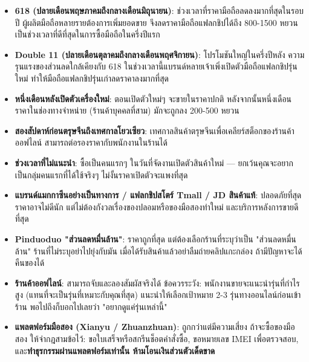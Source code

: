 \begin{itemize}
  \item \textbf{618 (ปลายเดือนพฤษภาคมถึงกลางเดือนมิถุนายน)}: ช่วงเวลาที่ราคามือถือลดลงมากที่สุดในรอบปี ผู้ผลิตมือถือหลายรายต้องการเพิ่มยอดขาย จึงลดราคามือถือแฟลกชิปได้ถึง 800-1500 หยวน เป็นช่วงเวลาที่ดีที่สุดในการซื้อมือถือในครึ่งปีแรก
  \item \textbf{Double 11 (ปลายเดือนตุลาคมถึงกลางเดือนพฤศจิกายน)}: โปรโมชันใหญ่ในครึ่งปีหลัง ความรุนแรงของส่วนลดใกล้เคียงกับ 618 ในช่วงเวลานี้แบรนด์หลายเจ้าเพิ่งเปิดตัวมือถือแฟลกชิปรุ่นใหม่ ทำให้มือถือแฟลกชิปรุ่นเก่าลดราคาลงมากที่สุด
  \item \textbf{หนึ่งเดือนหลังเปิดตัวเครื่องใหม่}: ตอนเปิดตัวใหม่ๆ จะขายในราคาปกติ หลังจากนั้นหนึ่งเดือน ราคาในช่องทางจำหน่าย (ร้านค้าบุคคลที่สาม) มักจะถูกลง 200-500 หยวน
  \item \textbf{สองสัปดาห์ก่อนตรุษจีนถึงเทศกาลโยวเซียว}: เทศกาลสินค้าตรุษจีนเพื่อเคลียร์สต็อกของร้านค้าออฟไลน์ สามารถต่อรองราคากับพนักงานในร้านได้
  \item \textbf{ช่วงเวลาที่ไม่แนะนำ}: ซื้อเป็นคนแรกๆ ในวันที่จัดงานเปิดตัวสินค้าใหม่ — ยกเว้นคุณจะอยากเป็นกลุ่มคนแรกที่ได้ใช้จริงๆ ไม่งั้นราคาเปิดตัวจะแพงที่สุด
\end{itemize}


\begin{itemize}
  \item \textbf{แบรนด์แมกกาซีนอย่างเป็นทางการ / แฟลกชิปสโตร์ Tmall / JD สินค้าแท้}: ปลอดภัยที่สุด ราคาอาจไม่ดีนัก แต่ไม่ต้องกังวลเรื่องของปลอมหรือของมือสองทำใหม่ และบริการหลังการขายดีที่สุด
  \item \textbf{Pinduoduo "ส่วนลดหมื่นล้าน"}: ราคาถูกที่สุด แต่ต้องเลือกร้านที่ระบุว่าเป็น "ส่วนลดหมื่นล้าน" ร้านที่ไม่ระบุอย่าไปยุ่งกับมัน เมื่อได้รับสินค้าแล้วอย่าลืมถ่ายคลิปแกะกล่อง ถ้ามีปัญหาจะได้คืนของได้
  \item \textbf{ร้านค้าออฟไลน์}: สามารถจับและลองสัมผัสจริงได้ ข้อควรระวัง: พนักงานขายจะแนะนำรุ่นที่กำไรสูง (แทนที่จะเป็นรุ่นที่เหมาะกับคุณที่สุด) แนะนำให้เลือกเป้าหมาย 2-3 รุ่นทางออนไลน์ก่อนเข้าร้าน พอไปถึงก็บอกไปเลยว่า "อยากดูแค่รุ่นเหล่านี้"
  \item \textbf{แพลตฟอร์มมือสอง (Xianyu / Zhuanzhuan)}: ถูกกว่าแต่มีความเสี่ยง ถ้าจะซื้อของมือสอง ให้จำกฎสามข้อไว้: ขอใบเสร็จหรือสกรีนช็อตคำสั่งซื้อ, ขอหมายเลข IMEI เพื่อตรวจสอบ, และ\textbf{ทำธุรกรรมผ่านแพลตฟอร์มเท่านั้น ห้ามโอนเงินส่วนตัวเด็ดขาด}
\end{itemize}

